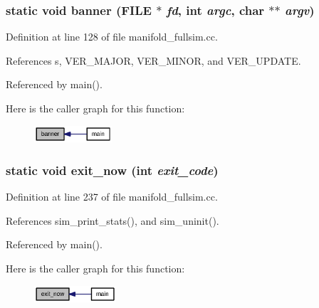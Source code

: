 \subsubsection[{banner}]{\setlength{\rightskip}{0pt plus 5cm}static void banner (FILE $\ast$ {\em fd}, \/  int {\em argc}, \/  char $\ast$$\ast$ {\em argv})\hspace{0.3cm}{\tt  [static]}}\label{manifold__fullsim_8cc_bb4b863ca4fbb167c2f78c8ad25f16cd}




Definition at line 128 of file manifold\_\-fullsim.cc.

References s, VER\_\-MAJOR, VER\_\-MINOR, and VER\_\-UPDATE.

Referenced by main().

Here is the caller graph for this function:\nopagebreak
\begin{figure}[H]
\begin{center}
\leavevmode
\includegraphics[width=82pt]{manifold__fullsim_8cc_bb4b863ca4fbb167c2f78c8ad25f16cd_icgraph}
\end{center}
\end{figure}
\subsubsection[{exit\_\-now}]{\setlength{\rightskip}{0pt plus 5cm}static void exit\_\-now (int {\em exit\_\-code})\hspace{0.3cm}{\tt  [static]}}\label{manifold__fullsim_8cc_8cf40713cf8239d39ed7d0967eec7cf4}




Definition at line 237 of file manifold\_\-fullsim.cc.

References sim\_\-print\_\-stats(), and sim\_\-uninit().

Referenced by main().

Here is the caller graph for this function:\nopagebreak
\begin{figure}[H]
\begin{center}
\leavevmode
\includegraphics[width=86pt]{manifold__fullsim_8cc_8cf40713cf8239d39ed7d0967eec7cf4_icgraph}
\end{center}
\end{figure}

